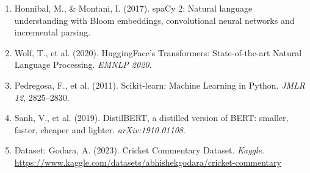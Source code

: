 \documentclass[12pt,a4paper]{article}
\begin{document}
\begin{enumerate}[leftmargin=1.5em]
  \item Honnibal, M., \& Montani, I. (2017). spaCy 2: Natural language understanding with Bloom embeddings, convolutional neural networks and incremental parsing.
  \item Wolf, T., et al. (2020). HuggingFace's Transformers: State-of-the-art Natural Language Processing. \textit{EMNLP 2020}.
  \item Pedregosa, F., et al. (2011). Scikit-learn: Machine Learning in Python. \textit{JMLR 12}, 2825--2830.
  \item Sanh, V., et al. (2019). DistilBERT, a distilled version of BERT: smaller, faster, cheaper and lighter. \textit{arXiv:1910.01108}.
  \item Dataset: Godara, A. (2023). Cricket Commentary Dataset. \textit{Kaggle}. \url{https://www.kaggle.com/datasets/abhishekgodara/cricket-commentary}
\end{enumerate}
\end{document}
